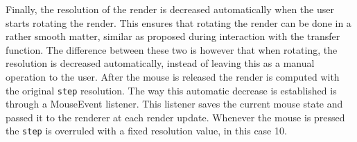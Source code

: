 Finally, the resolution of the render is decreased automatically when the user starts rotating the render. This ensures that rotating the render can be done in a rather smooth matter, similar as proposed during interaction with the transfer function. The difference between these two is however that when rotating, the resolution is decreased automatically, instead of leaving this as a manual operation to the user.
After the mouse is released the render is computed with the original \texttt{step} resolution.
The way this automatic decrease is established is through a MouseEvent listener.
This listener saves the current mouse state and passed it to the renderer at each render update.
Whenever the mouse is pressed the \texttt{step} is overruled with a fixed resolution value, in this case 10.
